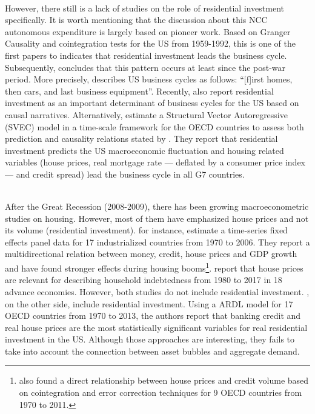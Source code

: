 \documentclass[12pt]{article}
\begin{document}
\\
However, there still is a lack of studies on the role of residential investment specifically.
It is worth mentioning that the discussion about this NCC autonomous expenditure is largely based on \textcite{green_follow_1997} pioneer work.
Based on Granger Causality and cointegration tests for the US from 1959-1992, this is one of the first papers to indicates that residential investment leads the business cycle.
Subsequently, \textcite{leamer_housing_2007} concludes that this pattern occurs at least since the post-war period.
More precisely,  \textcite[p.~8]{leamer_housing_2007} describes US business cycles as follows: ``[f]irst homes, then cars,
and last business equipment''.
Recently, \textcites{fiebiger_semi-autonomous_2018}{fiebiger_trend_2017} also report residential investment as an important determinant of business cycles for the US based on causal narratives.
Alternatively, \textcite{huang_is_2020} estimate a Structural Vector Autoregressive (SVEC) model in a time-scale framework for the OECD countries to assess both prediction and causality relations stated by \textcite{leamer_housing_2007}.
They report that residential investment predicts the US  macroeconomic fluctuation and housing related variables (house prices, real mortgage rate --- deflated by a consumer price index --- and credit spread) lead the business cycle in all G7 countries.

\\
After the Great Recession (2008-2009), there has been growing macroeconometric studies on housing.
However, most of them have emphasized house prices and not its volume (residential investment).
\textcite{goodhart_house_2008} for instance, estimate a time-series fixed effects panel data for 17 industrialized countries from 1970 to 2006. They report a multidirectional relation between money, credit, house prices and GDP growth and have found stronger effects during housing booms\footnote{\textcite{Arestis_Bank_2014} also found a  direct relationship between house prices and credit volume based on cointegration and error correction techniques for 9 OECD countries from 1970 to 2011.}. 
\textcite{wood_house_2020} report that house prices are relevant for describing household indebtedness from 1980 to 2017 in 18 advance economies.
However, both studies do not include residential investment.
\textcite{Arestis_Residential_2014}, on the other side, include residential investment. Using a ARDL model for 17 OECD countries from 1970 to 2013, the authors report that banking credit and real house prices are the most statistically significant variables for real residential investment in the US.
Although those approaches are interesting, they fails to take into account the connection between asset bubbles and aggregate demand.
\end{document}
